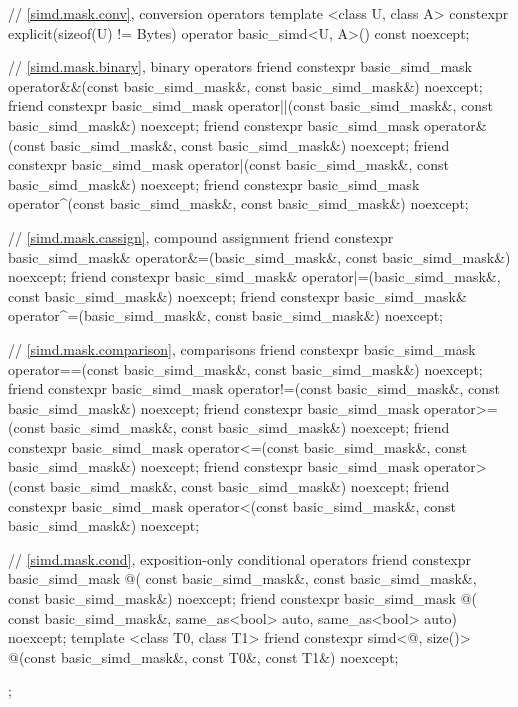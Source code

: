 \begin{codeblock}
{  // \ref{simd.mask.conv},  conversion operators
  template <class U, class A>
    constexpr explicit(sizeof(U) != Bytes) operator basic_simd<U, A>() const noexcept;

  // \ref{simd.mask.binary},  binary operators
  friend constexpr basic_simd_mask
    operator&&(const basic_simd_mask&, const basic_simd_mask&) noexcept;
  friend constexpr basic_simd_mask
    operator||(const basic_simd_mask&, const basic_simd_mask&) noexcept;
  friend constexpr basic_simd_mask
    operator&(const basic_simd_mask&, const basic_simd_mask&) noexcept;
  friend constexpr basic_simd_mask
    operator|(const basic_simd_mask&, const basic_simd_mask&) noexcept;
  friend constexpr basic_simd_mask
    operator^(const basic_simd_mask&, const basic_simd_mask&) noexcept;

  // \ref{simd.mask.cassign},  compound assignment
  friend constexpr basic_simd_mask&
    operator&=(basic_simd_mask&, const basic_simd_mask&) noexcept;
  friend constexpr basic_simd_mask&
    operator|=(basic_simd_mask&, const basic_simd_mask&) noexcept;
  friend constexpr basic_simd_mask&
    operator^=(basic_simd_mask&, const basic_simd_mask&) noexcept;

  // \ref{simd.mask.comparison},  comparisons
  friend constexpr basic_simd_mask
    operator==(const basic_simd_mask&, const basic_simd_mask&) noexcept;
  friend constexpr basic_simd_mask
    operator!=(const basic_simd_mask&, const basic_simd_mask&) noexcept;
  friend constexpr basic_simd_mask
    operator>=(const basic_simd_mask&, const basic_simd_mask&) noexcept;
  friend constexpr basic_simd_mask
    operator<=(const basic_simd_mask&, const basic_simd_mask&) noexcept;
  friend constexpr basic_simd_mask
    operator>(const basic_simd_mask&, const basic_simd_mask&) noexcept;
  friend constexpr basic_simd_mask
    operator<(const basic_simd_mask&, const basic_simd_mask&) noexcept;

  // \ref{simd.mask.cond},  exposition-only conditional operators
  friend constexpr basic_simd_mask @\simdselect@(
    const basic_simd_mask&, const basic_simd_mask&, const basic_simd_mask&) noexcept;
  friend constexpr basic_simd_mask @\simdselect@(
    const basic_simd_mask&, same_as<bool> auto, same_as<bool> auto) noexcept;
  template <class T0, class T1>
    friend constexpr simd<@\seebelow@, size()>
      @\simdselect@(const basic_simd_mask&, const T0&, const T1&) noexcept;
};
\end{codeblock}

